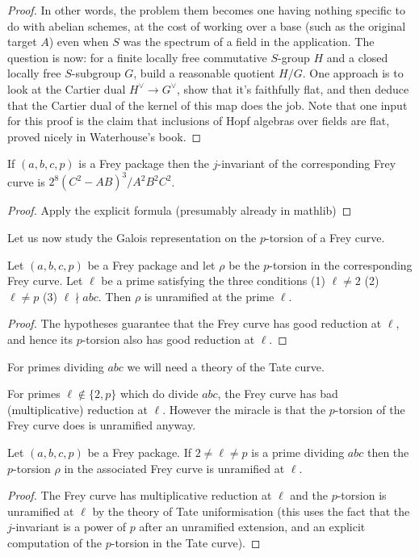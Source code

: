 \begin{corollary}
\begin{corollary}
\begin{proof}
  In other words, the problem them becomes one having nothing specific to do with abelian schemes, at the cost of working over a base (such as the original target $A$) even when $S$ was the spectrum of a field in the application. The question is now: for a finite locally free commutative $S$-group $H$ and a closed locally free $S$-subgroup $G$, build a reasonable quotient $H/G$. One approach is to look at the Cartier dual $H^\vee\to G^\vee$, show that it's faithfully flat, and then deduce that the Cartier dual of the kernel of this map does the job. Note that one input for this proof is the claim that inclusions of Hopf algebras over fields are flat, proved nicely in Waterhouse’s book.
\end{proof}
\begin{theorem}\label{Frey_curve_j} If $(a,b,c,p)$ is a Frey package then the $j$-invariant of the corresponding Frey curve is $2^8(C^2-AB)^3/A^2B^2C^2$.
\end{theorem}
\begin{proof}
  Apply the explicit formula (presumably already in mathlib)
\end{proof}

Let us now study the Galois representation on the $p$-torsion of a Frey curve.

\begin{theorem}\label{Frey_curve_mod_p_rep_at_good_primes} Let $(a,b,c,p)$ be a Frey package and let $\rho$ be
  the $p$-torsion in the corresponding Frey curve. Let $\ell$ be a prime satisfying the three
  conditions (1) $\ell\ne2$ (2) $\ell\ne p$ (3) $\ell\nmid abc$. Then $\rho$ is unramified at the prime $\ell$.
\end{theorem}
\begin{proof}
  The hypotheses guarantee that the Frey curve has good reduction at $\ell$, and hence its
  $p$-torsion also has good reduction at $\ell$.
\end{proof}

For primes dividing $abc$ we will need a theory of the Tate curve.



For primes $\ell\not\in\{2,p\}$ which do divide $abc$, the Frey curve has bad (multiplicative) reduction at $\ell$. However the miracle is that the $p$-torsion of the Frey curve does is unramified anyway.

\begin{theorem}\label{Frey_curve_mod_p_rep_at_bad_primes}

  Let $(a,b,c,p)$ be a Frey package. If $2\ne\ell\ne p$ is a prime dividing $abc$ then the 
  $p$-torsion $\rho$ in the associated Frey curve is unramified at $\ell$.
\end{theorem}
\begin{proof} The Frey curve has multiplicative reduction at $\ell$ and the $p$-torsion is unramified at $\ell$ by the theory of Tate uniformisation (this uses the fact that the $j$-invariant is a power of $p$ after an unramified extension, and an explicit computation of the $p$-torsion in the Tate curve).
\end{proof}


\end{corollary}
\end{corollary}
